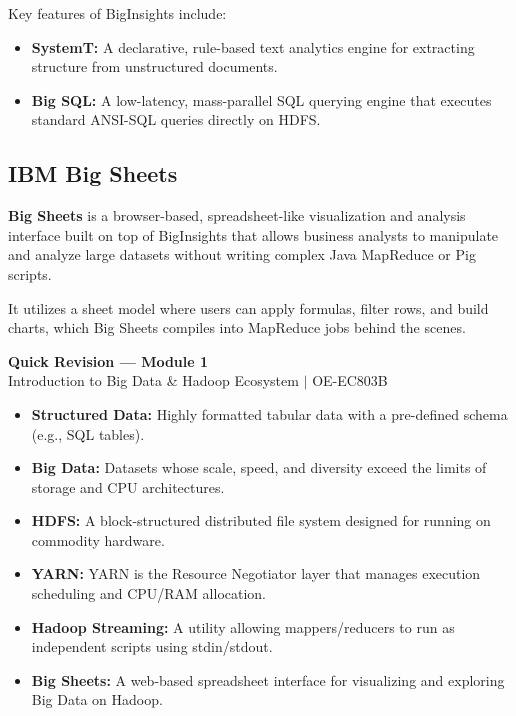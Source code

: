 \documentclass[12pt,a4paper]{article}
\begin{document}
Key features of BigInsights include:
\begin{itemize}[leftmargin=*, itemsep=3pt]
  \item \textbf{SystemT:} A declarative, rule-based text analytics engine for extracting structure from unstructured documents.
  \item \textbf{Big SQL:} A low-latency, mass-parallel SQL querying engine that executes standard ANSI-SQL queries directly on HDFS.
\end{itemize}

\subsection{IBM Big Sheets}
\begin{tcolorbox}[defbox, title={Big Sheets}]
  \textbf{Big Sheets} is a browser-based, spreadsheet-like visualization and analysis interface built on top of BigInsights that allows business analysts to manipulate and analyze large datasets without writing complex Java MapReduce or Pig scripts.
\end{tcolorbox}

It utilizes a sheet model where users can apply formulas, filter rows, and build charts, which Big Sheets compiles into MapReduce jobs behind the scenes.

\newpage

\begin{center}
  {\large\bfseries\color{myred} Quick Revision --- Module 1}\\[3pt]
  {\small\color{mydark} Introduction to Big Data \& Hadoop Ecosystem $|$ OE-EC803B}
\end{center}
\noindent{\color{myred}\rule{\linewidth}{1.2pt}}
\vspace{8pt}

\begin{tcolorbox}[defbox, title={\textbf{One-Line Definitions}}]
\begin{itemize}[leftmargin=*, itemsep=3pt, topsep=0pt]
  \item \textbf{Structured Data:} Highly formatted tabular data with a pre-defined schema (e.g., SQL tables).
  \item \textbf{Big Data:} Datasets whose scale, speed, and diversity exceed the limits of storage and CPU architectures.
  \item \textbf{HDFS:} A block-structured distributed file system designed for running on commodity hardware.
  \item \textbf{YARN:} YARN is the Resource Negotiator layer that manages execution scheduling and CPU/RAM allocation.
  \item \textbf{Hadoop Streaming:} A utility allowing mappers/reducers to run as independent scripts using stdin/stdout.
  \item \textbf{Big Sheets:} A web-based spreadsheet interface for visualizing and exploring Big Data on Hadoop.
\end{itemize}
\end{tcolorbox}
\end{document}

